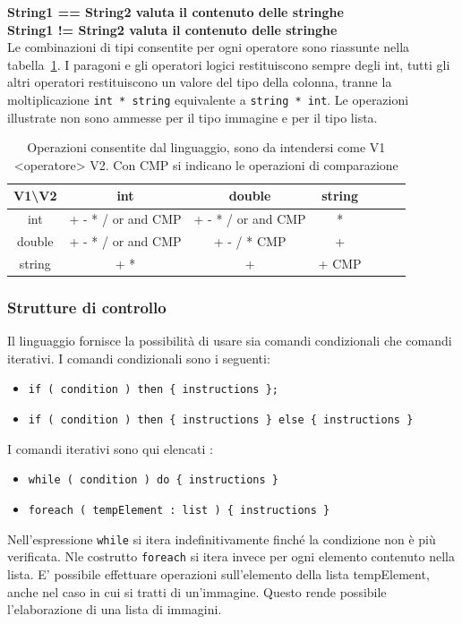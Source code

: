 \documentclass[10pt]{article}
\begin{document}
\textbf{String1 == String2 valuta il contenuto delle stringhe}\\
\textbf{String1 != String2 valuta il contenuto delle stringhe}\\

Le combinazioni di tipi consentite per ogni operatore sono riassunte nella tabella~\ref{table:operatori}. I paragoni e gli operatori logici restituiscono sempre degli int, tutti gli altri operatori restituiscono un valore del tipo della colonna, tranne la moltiplicazione \texttt{int * string} equivalente a \texttt{string * int}. Le operazioni illustrate non sono ammesse per il tipo immagine e per il tipo lista.\\



\begin{table}
	\centering
	\begin{tabular}{|c|c|c|c|c|c|c|}
		\hline
		V1\textbackslash V2   &        int            &    double             &  string       \\ \hline
		int                    &  + - * / or and CMP   &  + - * / or and CMP   &    *          \\ \hline
		double       			& + - * / or and CMP    & + - / * CMP   		&     +         \\ \hline
		string        		     &        + *             &         +      	     & +    CMP      \\ \hline
	\end{tabular}
	\caption{Operazioni consentite dal linguaggio, sono da intendersi come V1 <operatore> V2. Con CMP si indicano le operazioni di comparazione}
	\label{table:operatori}
\end{table}
\clearpage
\subsubsection{Strutture di controllo}
Il linguaggio fornisce la possibilità di usare sia comandi condizionali che comandi iterativi. I comandi condizionali sono i seguenti:
\begin{itemize}
	\item \texttt{if ( condition ) then \{ instructions \};}
	\item \texttt{if ( condition ) then \{ instructions \} else \{ instructions \}}
\end{itemize}
I comandi iterativi sono qui elencati :
\begin{itemize}
	\item \texttt{while ( condition ) do \{ instructions \}}
	\item \texttt{foreach ( tempElement : list ) \{ instructions \} }
\end{itemize}
Nell'espressione \texttt{while} si itera indefinitivamente finché la condizione non è più verificata. Nle costrutto \texttt{foreach} si itera invece per ogni elemento contenuto nella lista. E' possibile effettuare operazioni sull'elemento della lista tempElement, anche nel caso in cui si tratti di un'immagine. Questo rende possibile l'elaborazione di una lista di immagini.\\
\end{document}
